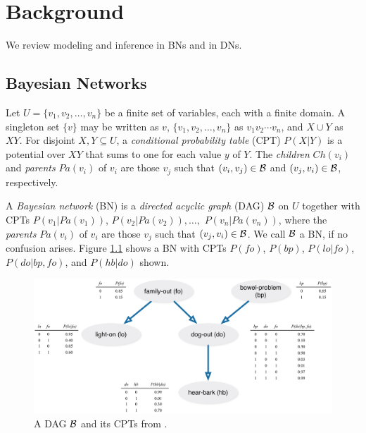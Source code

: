 \chapter{Background}
\label{sec:background}

\reversemarginpar

We review modeling and inference in BNs and in DNs.

\section{Bayesian Networks}
\label{sec:baysian_networks}

Let $U = \{ v_1, v_2, \ldots , v_n \}$ be a finite set of variables, each with a finite domain.
A singleton set $\{v\}$ may be written as $v$, $\{ v_1, v_2, \ldots, v_n \}$ as $v_1 v_2 \cdots v_n$, and $X \cup Y$ as $XY$.
For disjoint $X,Y \subseteq U$, a \emph{conditional probability table} (CPT) $P(X|Y)$ is a potential over $XY$ that sums to one for each value $y$ of $Y$.
The \emph{children} $Ch(v_i)$ and \emph{parents} $Pa(v_i)$ of $v_i$ are those $v_j$ such that $(v_i,v_j) \in \cal{B}$ and $(v_j,v_i) \in \cal{B}$, respectively.

A \emph{Bayesian network} (BN) \cite{pear88} is a \emph{directed acyclic graph} (DAG) $\cal{B}$ on $U$ together with CPTs $P(v_1 | Pa(v_1))$, $P(v_2|Pa(v_2)),$$\ldots,$ $P(v_n|Pa(v_n))$, where the \emph{parents} $Pa(v_i)$ of $v_i$ are those $v_j$ such that $(v_j,v_i) \in \cal{B}$.
We call $\cal{B}$ a BN, if no confusion arises.
Figure \ref{fig:dag} shows a BN with CPTs $P(fo)$, $P(bp)$, $P(lo|fo)$, $P(do|bp,fo)$, and $P(hb|do)$ shown.

\begin{figure}[hbt]
    \begin{center}
        \includegraphics[width=\textwidth]{img/DAG_darwiche}
    \end{center}
    \caption{A DAG ${\cal B}$ and its CPTs from \cite{darwiche09}.}
    \label{fig:dag}
\end{figure}

